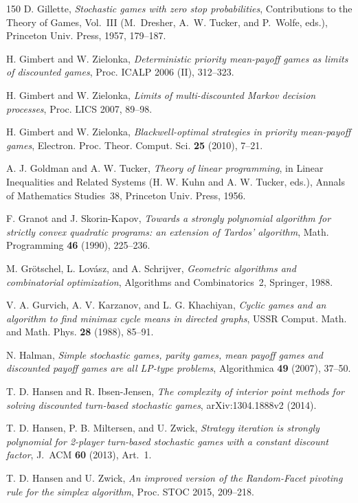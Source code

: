 \begin{thebibliography}{150}
D. Gillette, \emph{Stochastic games with zero stop probabilities}, Contributions to the Theory of Games, Vol.~III (M.~Dresher, A.~W. Tucker, and P.~Wolfe, eds.), Princeton Univ. Press, 1957, 179--187.

H. Gimbert and W. Zielonka, \emph{Deterministic priority mean-payoff games as limits of discounted games}, Proc. ICALP 2006 (II), 312--323.

H. Gimbert and W. Zielonka, \emph{Limits of multi-discounted Markov decision processes}, Proc. LICS 2007, 89--98.

H. Gimbert and W. Zielonka, \emph{Blackwell-optimal strategies in priority mean-payoff games}, Electron. Proc. Theor. Comput. Sci. \textbf{25} (2010), 7--21.

A. J. Goldman and A. W. Tucker, \emph{Theory of linear programming}, in Linear Inequalities and Related Systems (H. W. Kuhn and A. W. Tucker, eds.), Annals of Mathematics Studies~38, Princeton Univ. Press, 1956.

F. Granot and J. Skorin-Kapov, \emph{Towards a strongly polynomial algorithm for strictly convex quadratic programs: an extension of Tardos' algorithm}, Math. Programming \textbf{46} (1990), 225--236.

M. Gr\"otschel, L. Lov\'asz, and A. Schrijver, \emph{Geometric algorithms and combinatorial optimization}, Algorithms and Combinatorics~2, Springer, 1988.

V. A. Gurvich, A. V. Karzanov, and L. G. Khachiyan, \emph{Cyclic games and an algorithm to find minimax cycle means in directed graphs}, USSR Comput. Math. and Math. Phys. \textbf{28} (1988), 85--91.

N. Halman, \emph{Simple stochastic games, parity games, mean payoff games and discounted payoff games are all LP-type problems}, Algorithmica \textbf{49} (2007), 37--50.

T. D. Hansen and R. Ibsen-Jensen, \emph{The complexity of interior point methods for solving discounted turn-based stochastic games}, arXiv:1304.1888v2 (2014).

T. D. Hansen, P. B. Miltersen, and U. Zwick, \emph{Strategy iteration is strongly polynomial for 2-player turn-based stochastic games with a constant discount factor}, J.~ACM \textbf{60} (2013), Art.~1.

T. D. Hansen and U. Zwick, \emph{An improved version of the Random-Facet pivoting rule for the simplex algorithm}, Proc. STOC 2015, 209--218.


\end{thebibliography}
